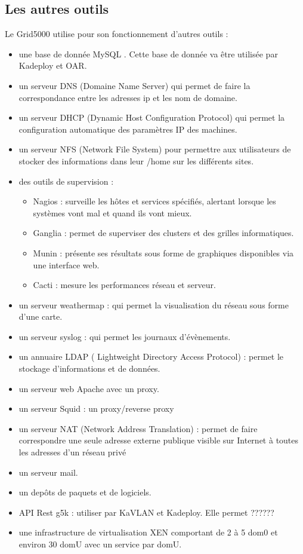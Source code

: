 \documentclass[a4paper, 10pt, onecolumn]{report}
\begin{document}
		\subsection{Les autres outils}
			Le Grid5000 utilise pour son fonctionnement d'autres outils :
				\begin{itemize}
					\item une base de donnée MySQL . Cette base de donnée va \^etre utilisée par Kadeploy et OAR.
					\item un serveur DNS (Domaine Name Server) qui permet de faire la correspondance entre les adresses ip et les nom de domaine.			
					\item un serveur DHCP (Dynamic Host Configuration Protocol) qui permet la configuration automatique des paramètres IP des machines.
					\item un serveur NFS (Network File System) pour permettre aux utilisateurs de stocker des informations dans leur /home sur les
 différents sites.
 					\item des  outils de supervision : \begin{itemize}
 															\item 	Nagios : surveille les hôtes et services spécifiés, alertant lorsque les systèmes vont mal et quand ils vont mieux.
 															\item 	Ganglia : permet de superviser des clusters et des grilles informatiques. 
 															\item 	Munin : présente ses résultats sous forme de graphiques disponibles via une interface web.
 															\item 	Cacti : mesure les performances réseau et serveur.
 														\end{itemize}
 					\item un serveur weathermap : qui permet la visualisation du réseau sous forme d'une carte.
 					\item un serveur syslog : qui permet les journaux d'évènements.
 					\item un annuaire LDAP ( Lightweight Directory Access Protocol) : permet le stockage d'informations et de données.
 					\item un serveur web Apache avec un proxy.
 					\item un serveur Squid :  un proxy/reverse proxy
 					\item un serveur NAT (Network Address Translation) : permet de faire correspondre une seule adresse externe publique visible sur Internet à toutes les adresses d'un réseau privé
 					\item un serveur mail.
 					\item un dep\^ots de paquets et de logiciels.
 					\item API Rest g5k : utiliser par KaVLAN et Kadeploy. Elle permet ??????
 					\item une infrastructure de virtualisation XEN comportant de 2 à 5 dom0 et environ 30 domU avec un service par domU.
 					
				\end{itemize}
	
\end{document}
